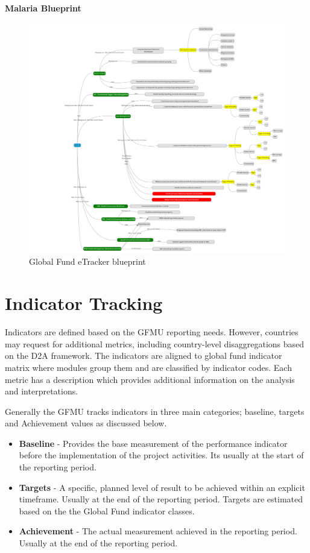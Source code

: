 \documentclass[]{book}
\providecommand{\tightlist}{%
  \setlength{\itemsep}{0pt}\setlength{\parskip}{0pt}}
\begin{document}
\hypertarget{malaria-blueprint}{%
\subsubsection{Malaria Blueprint}\label{malaria-blueprint}}

\begin{figure}

{\centering \includegraphics[width=0.8\linewidth]{./images/gfmublueprint-mal} 

}

\caption{Global Fund eTracker blueprint}\label{fig:nice-fig3}
\end{figure}

\hypertarget{indicator-tracking}{%
\chapter{Indicator Tracking}\label{indicator-tracking}}

Indicators are defined based on the GFMU reporting needs. However, countries may request for additional metrics, including country-level disaggregations based on the D2A framework. The indicators are aligned to global fund indicator matrix where modules group them and are classified by indicator codes. Each metric has a description which provides additional information on the analysis and interpretations.

Generally the GFMU tracks indicators in three main categories; baseline, targets and Achievement values as discussed below.

\begin{itemize}
\tightlist
\item
  \textbf{Baseline} - Provides the base measurement of the performance indicator before the implementation of the project
  activities. Its usually at the start of the reporting period.
\item
  \textbf{Targets} - A specific, planned level of result to be achieved within an explicit timeframe. Usually at the end of the reporting period. Targets are estimated based on the the Global Fund indicator classes.
\item
  \textbf{Achievement} - The actual measurement achieved in the reporting period. Usually at the end of the reporting period.
\end{itemize}
\end{document}
